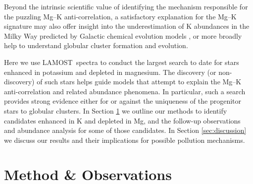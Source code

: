 \documentclass[a4paper,fleqn,usenatbib]{mnras}
\newcommand{\LamostGiants}{454,180}
\newcommand{\project}[1]{#1}
\newcommand{\lamost}{\project{LAMOST}}
\begin{document}

Beyond the intrinsic scientific value of identifying the mechanism responsible for the puzzling Mg--K anti-correlation, a satisfactory explanation for the Mg--K signature may also offer insight into the underestimation of K abundances in the Milky Way predicted by Galactic chemical evolution models \citep{kobayashi2011}, or more broadly help to understand globular cluster formation and evolution. 

Here we use \lamost\ spectra to conduct the largest search to date for stars enhanced in potassium and depleted in magnesium. The discovery (or non-discovery) of such stars helps guide models that attempt to explain the Mg--K anti-correlation and related abundance phenomena. In particular, such a search provides strong evidence either for or against the uniqueness of the progenitor stars to globular clusters. In Section \ref{sec:method} we outline our methods to identify candidates enhanced in K and depleted in Mg, and the follow-up observations and abundance analysis for some of those candidates. In Section \ref{sec:discussion} we discuss our results and their implications for possible pollution mechanisms. 




\section{Method \& Observations}
\label{sec:method}
\end{document}
